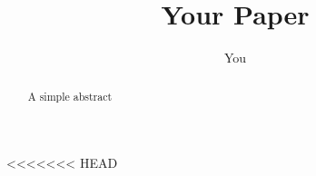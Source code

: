 \documentclass{article}
\title{Your Paper}
\author{You}
\begin{document}
\maketitle
\begin{abstract}
A simple abstract
\end{abstract}





<<<<<<< HEAD
\end{document}
